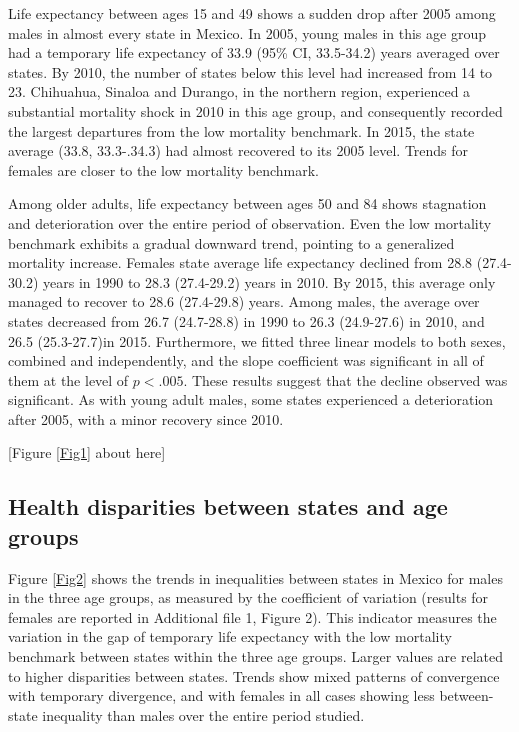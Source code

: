 \documentclass{bmcart}
\begin{document}
Life expectancy between ages 15 and 49 shows a sudden drop after 2005 among males in almost every state in Mexico. In 2005, young males in this age group had a temporary life expectancy of 33.9 (95\% CI, 33.5-34.2) years averaged over states. By 2010, the number of states below this level had increased from 14 to 23. Chihuahua, Sinaloa and Durango, in the northern region, experienced a substantial mortality shock in 2010 in this age group, and consequently recorded the largest departures from the low mortality benchmark. In 2015, the state average (33.8, 33.3-.34.3) had almost recovered to its 2005 level.
Trends for females are closer to the low mortality benchmark.

Among older adults, life expectancy between ages 50 and 84 shows stagnation and deterioration over the entire period of observation. Even the low mortality benchmark exhibits a gradual downward trend, pointing to a generalized mortality increase. Females state average life expectancy declined from 28.8 (27.4-30.2) years in 1990 to 28.3 (27.4-29.2) years in 2010. By 2015, this average only managed to recover to 28.6 (27.4-29.8) years. Among males, the average over states decreased from 26.7 (24.7-28.8) in 1990 to 26.3 (24.9-27.6) in 2010, and 26.5 (25.3-27.7)in 2015. Furthermore, we fitted three linear models to both sexes, combined and independently, and the slope coefficient was significant in all of them at the level of $p<.005$. These results suggest that the decline observed was significant. As with young adult males, some states experienced a deterioration after 2005, with a minor recovery since 2010.\\

\begin{center}
[Figure \ref{Fig1} about here]
\end{center}

\subsection*{Health disparities between states and age groups}
Figure \ref{Fig2} shows the trends in inequalities between states in Mexico for males in the three age groups, as measured by the coefficient of variation (results for females are reported in Additional file 1, Figure 2). This indicator measures the variation in the gap of temporary life expectancy with the low mortality benchmark between states within the three age groups. Larger values are related to higher disparities between states. Trends show mixed patterns of convergence with temporary divergence, and with females in all cases showing less between-state inequality than males over the entire period studied. 
\end{document}
